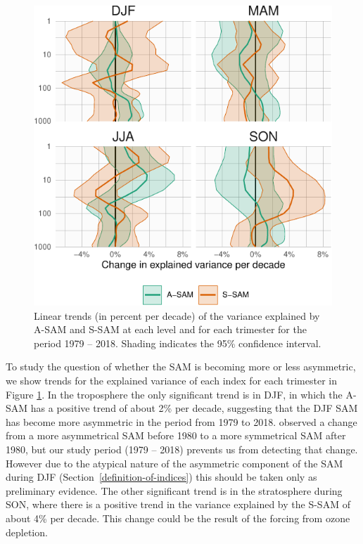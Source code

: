 \documentclass[smallextended]{svjour3}       %
\begin{document}
\begin{figure}
\includegraphics{r-squared-trend-1} \caption{Linear trends (in percent per decade) of the variance explained by A\nobreakdash-SAM and S\nobreakdash-SAM at each level and for each trimester for the period 1979 -- 2018. Shading indicates the 95\% confidence interval.}\label{fig:r-squared-trend}
\end{figure}

To study the question of whether the SAM is becoming more or less asymmetric, we show trends for the explained variance of each index for each trimester in Figure \ref{fig:r-squared-trend}.
In the troposphere the only significant trend is in DJF, in which the A\nobreakdash-SAM has a positive trend of about 2\% per decade, suggesting that the DJF SAM has become more asymmetric in the period from 1979 to 2018.
\citet{fogt2012} observed a change from a more asymmetrical SAM before 1980 to a more symmetrical SAM after 1980, but our study period (1979 -- 2018) prevents us from detecting that change.
However due to the atypical nature of the asymmetric component of the SAM during DJF (Section~\ref{definition-of-indices}) this should be taken only as preliminary evidence.
The other significant trend is in the stratosphere during SON, where there is a positive trend in the variance explained by the S\nobreakdash-SAM of about 4\% per decade.
This change could be the result of the forcing from ozone depletion.
\end{document}

